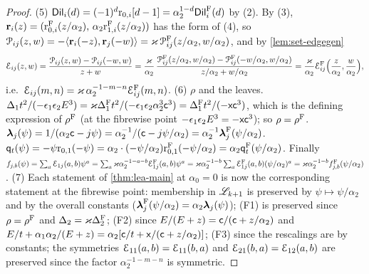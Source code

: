 \begin{proof}
(5) $\mathsf{Dil}_i(d) = (-1)^d\mathrm{r}_{0,i}[d-1] = \alpha_2^{1-d}\mathsf{Dil}_i^{\mathrm{F}}(d)$ by (2). By (3), $\mathbf{r}_i(z) = (\mathrm{r}^{\mathrm{F}}_{0,i}(z/\alpha_2),\,\alpha_2\mathrm{r}^{\mathrm{F}}_{1,i}(z/\alpha_2))$ has the form of (4), so $\mathcal{P}_{ij}(z,w) = -\langle\mathbf{r}_i(-z),\mathbf{r}_j(-w)\rangle = \varkappa\,\mathcal{P}_{ij}^{\mathrm{F}}(z/\alpha_2,w/\alpha_2)$, and by \cref{lem:set-edgegen}
\[
\mathcal{E}_{ij}(z,w) = \frac{\mathcal{P}_{ij}(z,w) - \mathcal{P}_{ij}(-w,w)}{z+w} = \frac{\varkappa}{\alpha_2}\,\frac{\mathcal{P}_{ij}^{\mathrm{F}}(z/\alpha_2,w/\alpha_2) - \mathcal{P}_{ij}^{\mathrm{F}}(-w/\alpha_2,w/\alpha_2)}{z/\alpha_2 + w/\alpha_2} = \frac{\varkappa}{\alpha_2}\mathcal{E}_{ij}^{\mathrm{F}}\Bigl(\frac{z}{\alpha_2},\frac{w}{\alpha_2}\Bigr),
\]
i.e.\ $\mathcal{E}_{ij}(m,n) = \varkappa\,\alpha_2^{-1-m-n}\mathcal{E}_{ij}^{\mathrm{F}}(m,n)$.
(6) $\rho$ and the leaves. $\Delta_1t^2/(-\epsilon_1\epsilon_2E^3) = \varkappa\Delta_1^{\mathrm{F}}t^2/(-\epsilon_1\epsilon_2\alpha_2^3\mathsf{c}^3) = \Delta_1^{\mathrm{F}}t^2/(-\mathsf{x}\mathsf{c}^3)$, which is the defining expression of $\rho^{\mathrm{F}}$ (at the fibrewise point $-\epsilon_1\epsilon_2E^3 = -\mathsf{x}\mathsf{c}^3$); so $\rho = \rho^{\mathrm{F}}$. $\boldsymbol{\lambda}_j(\psi) = 1/(\alpha_2\mathsf{c} - j\psi) = \alpha_2^{-1}/(\mathsf{c} - j\psi/\alpha_2) = \alpha_2^{-1}\boldsymbol{\lambda}_j^{\mathrm{F}}(\psi/\alpha_2)$. $\mathsf{q}_{t}(\psi) = -\psi\mathrm{r}_{0,1}(-\psi) = \alpha_2\cdot(-\psi/\alpha_2)\mathrm{r}^{\mathrm{F}}_{0,1}(-\psi/\alpha_2) = \alpha_2\mathsf{q}_{t}^{\mathrm{F}}(\psi/\alpha_2)$. Finally $f_{j,b}(\psi) = \sum_a\mathcal{E}_{1j}(a,b)\psi^a = \sum_a\varkappa\alpha_2^{-1-a-b}\mathcal{E}_{1j}^{\mathrm{F}}(a,b)\psi^a = \varkappa\alpha_2^{-1-b}\sum_a\mathcal{E}^{\mathrm{F}}_{1j}(a,b)(\psi/\alpha_2)^a = \varkappa\alpha_2^{-1-b}f^{\mathrm{F}}_{j,b}(\psi/\alpha_2)$.
(7) Each statement of \cref{thm:lea-main} at $\alpha_0 = 0$ is now the corresponding statement at the fibrewise point: membership in $\mathscr{L}_{k+1}$ is preserved by $\psi\mapsto\psi/\alpha_2$ and by the overall constants ($\boldsymbol{\lambda}_j^{\mathrm{F}}(\psi/\alpha_2) = \alpha_2\boldsymbol{\lambda}_j(\psi)$); (F1) is preserved since $\rho = \rho^{\mathrm{F}}$ and $\Delta_2 = \varkappa\Delta_2^{\mathrm{F}}$; (F2) since $E/(E+z) = \mathsf{c}/(\mathsf{c}+z/\alpha_2)$ and $E/t + \alpha_1\alpha_2/(E+z) = \alpha_2[\mathsf{c}/t + \mathsf{x}/(\mathsf{c}+z/\alpha_2)]$; (F3) since the rescalings are by constants; the symmetries $\mathcal{E}_{11}(a,b) = \mathcal{E}_{11}(b,a)$ and $\mathcal{E}_{21}(b,a) = \mathcal{E}_{12}(a,b)$ are preserved since the factor $\alpha_2^{-1-m-n}$ is symmetric.
\end{proof}

